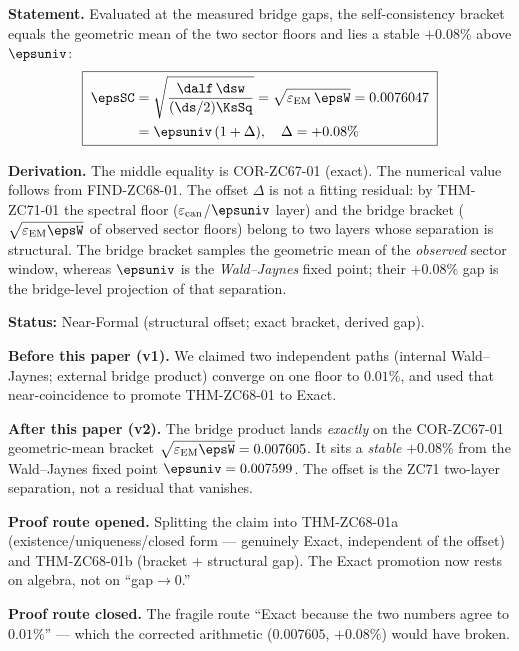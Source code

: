 \documentclass[12pt, a4paper]{article}
\renewcommand{\epsEM}{\varepsilon_{\rm EM}}
\renewcommand{\epscan}{\varepsilon_{\rm can}}
\begin{document}
\begin{formalbox}[title={THM-ZC68-01b: Bridge Bracket and Structural
  Offset ($R_0\!\to\!R_{\max}$, Near-Formal)}]

\textbf{Statement.}
Evaluated at the measured bridge gaps, the self-consistency bracket
equals the geometric mean of the two sector floors and lies a stable
$+0.08\%$ above $\epsuniv$:
\begin{equation}
  \boxed{\;
  \begin{aligned}
    \epsSC
    &= \sqrt{\frac{\dalf\,\dsw}{(\ds/2)\KsSq}}
    = \sqrt{\epsEM\,\epsW}
    = 0.0076047\\
    &= \epsuniv\,(1+\Delta),\quad \Delta=+0.08\%
  \end{aligned}
  \;}
  \label{eq:thm01b}
\end{equation}

\textbf{Derivation.}
The middle equality is COR-ZC67-01 (exact). The numerical value follows
from FIND-ZC68-01. The offset $\Delta$ is not a fitting residual: by
THM-ZC71-01 the spectral floor ($\epscan$/$\epsuniv$ layer) and the
bridge bracket ($\sqrt{\epsEM\epsW}$ of observed sector floors) belong
to two layers whose separation is structural. The bridge bracket
samples the geometric mean of the \emph{observed} sector window,
whereas $\epsuniv$ is the \emph{Wald--Jaynes} fixed point; their
$+0.08\%$ gap is the bridge-level projection of that separation.

\textbf{Status:} Near-Formal (structural offset; exact bracket,
derived gap).
\end{formalbox}

\begin{derivedbox}[title={Reframe: ``two paths converge ($0.01\%$)''
  $\to$ ``bracket identity with structural $+0.08\%$ offset''}]
\textbf{Before this paper (v1).} We claimed two independent paths
(internal Wald--Jaynes; external bridge product) converge on one floor
to $0.01\%$, and used that near-coincidence to promote
THM-ZC68-01 to Exact.

\textbf{After this paper (v2).} The bridge product lands \emph{exactly}
on the COR-ZC67-01 geometric-mean bracket $\sqrt{\epsEM\epsW}=0.007605$.
It sits a \emph{stable} $+0.08\%$ from the Wald--Jaynes fixed point
$\epsuniv=0.007599$. The offset is the ZC71 two-layer separation, not a
residual that vanishes.

\textbf{Proof route opened.} Splitting the claim into
THM-ZC68-01a (existence/uniqueness/closed form --- genuinely Exact,
independent of the offset) and THM-ZC68-01b (bracket + structural gap).
The Exact promotion now rests on algebra, not on ``gap${\to}0$.''

\textbf{Proof route closed.} The fragile route ``Exact because the two
numbers agree to $0.01\%$'' --- which the corrected arithmetic
($0.007605$, $+0.08\%$) would have broken.
\end{derivedbox}
\end{document}
